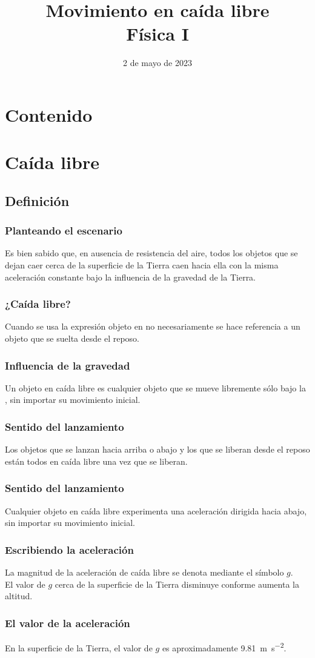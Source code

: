 \documentclass[14pt]{beamer}
\title{\Large{Movimiento en caída libre} \\ \normalsize{Física I}}
\date{2 de mayo de 2023}
\begin{document}
\maketitle

\section*{Contenido}

\section{Caída libre}
\subsection{Definición}

\begin{frame}
\frametitle{Planteando el escenario}
Es bien sabido que, en ausencia de resistencia del aire, \pause todos los objetos que se dejan caer cerca de la superficie de la Tierra caen hacia ella con la misma aceleración constante bajo la influencia de la gravedad de la Tierra.
\end{frame}
\begin{frame}
\frametitle{¿Caída libre?}
Cuando se usa la expresión objeto en  no necesariamente se hace referencia a
un objeto que se suelta desde el reposo.
\end{frame}
\begin{frame}
\frametitle{Influencia de la gravedad}
Un objeto en caída libre es cualquier objeto que se mueve libremente sólo bajo la , \pause sin importar su movimiento inicial.
\end{frame}
\begin{frame}
\frametitle{Sentido del lanzamiento}
Los objetos que se lanzan hacia arriba o abajo y los que se liberan desde el reposo están todos en caída libre una vez que se liberan.
\end{frame}
\begin{frame}
\frametitle{Sentido del lanzamiento}
Cualquier objeto en caída libre experimenta una aceleración dirigida hacia abajo, sin importar su movimiento inicial.
\end{frame}
\begin{frame}
\frametitle{Escribiendo la aceleración}
La magnitud de la aceleración de caída libre se denota mediante el símbolo $g$.
\\
\bigskip
\pause
El valor de $g$ cerca de la superficie de la Tierra disminuye conforme aumenta la altitud.
\end{frame}
\begin{frame}
\frametitle{El valor de la aceleración}
En la superficie de la Tierra, el valor de $g$ es aproximadamente \SI{9.81}{\meter\per\square\second}.
\end{frame}
\end{document}
